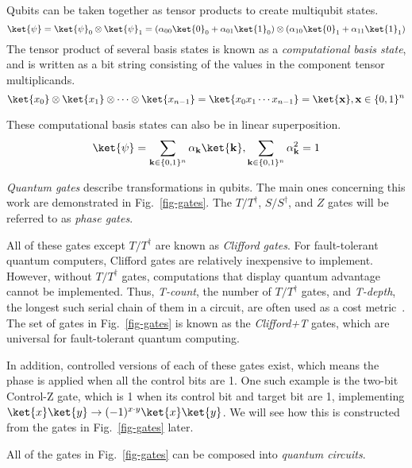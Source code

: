 Qubits can be taken together as tensor products to create multiqubit states.
\begin{equation}
\label{eq-multi-qb}
\ket{\psi} = \ket{\psi}_0 \otimes \ket{\psi}_1 =(\alpha_{00} \ket{0}_0 + \alpha_{01} \ket{1}_0) \otimes
(\alpha_{10} \ket{0}_1 + \alpha_{11} \ket{1}_1)
\end{equation}
The tensor product of several basis states is known as a \emph{computational basis state},
and is written as a bit string consisting of the values in the component tensor multiplicands.
\begin{equation}
\ket{x_0}\otimes\ket{x_1}\otimes\cdots\otimes\ket{x_{n-1}}=\ket{x_0 x_1 \cdots x_{n-1}}=\ket{\mathbf{x}},
\mathbf{x} \in \{0,1\}^n
\end{equation}

These computational basis states can also be in linear superposition.
\begin{equation}
\ket{\psi} = \sum_{\mathbf{k} \in \{0,1\}^n} \alpha_{\mathbf{k}}\ket{\mathbf{k}},
\sum_{\mathbf{k} \in \{0,1\}^n} \alpha_{\mathbf{k}}^2 = 1
\end{equation}

{\it Quantum gates} describe transformations in qubits. The main ones concerning this work
are demonstrated in Fig.~\ref{fig-gates}. The $T/T^{\dagger}$, $S/S^{\dagger}$, and $Z$
gates will be referred to as {\it phase gates}.

All of these gates except $T/T^{\dagger}$ are known as {\it Clifford gates}. For
fault-tolerant quantum computers, Clifford gates are relatively inexpensive to implement.
However, without $T/T^{\dagger}$ gates, computations that display quantum advantage
cannot be implemented. Thus, {\it T-count}, the number of $T/T^{\dagger}$ gates, and
{\it T-depth}, the longest such serial chain of them in a circuit, are often used as a
cost metric~\cite{amy-meet-in-middle}. The set of gates in Fig.~\ref{fig-gates} is known
as the {\it Clifford+T} gates, which are universal for fault-tolerant quantum computing.

In addition, controlled versions of each of these gates exist, which means the phase is
applied when all the control bits are 1. One such example is the two-bit Control-Z gate,
which is 1 when its control bit and target bit are 1, implementing
$\ket{x}\ket{y} \rightarrow (-1)^{x \cdot y}\ket{x}\ket{y}$. We will see how this is
constructed from the gates in Fig.~\ref{fig-gates} later.

All of the gates in Fig.~\ref{fig-gates} can be composed into
{\it quantum circuits}.

